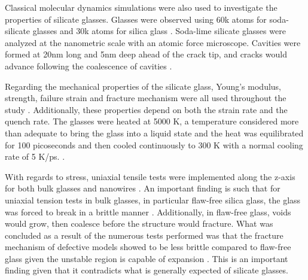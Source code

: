 Classical molecular dynamics simulations were also used to investigate the properties of silicate glasses. Glasses were observed using 60k atoms for soda-silicate glasses and 30k atoms for silica glass \cite{pedone2015dynamics}. Soda-lime silicate glasses were analyzed at the nanometric scale with an atomic force microscope. Cavities were formed at 20nm long and 5nm deep ahead of the crack tip, and cracks would advance following the coalescence of cavities \cite{pedone2015dynamics}.

Regarding the mechanical properties of the silicate glass, Young's modulus, strength, failure strain and fracture mechanism were all used throughout the study \cite{pedone2015dynamics}.  Additionally, these properties depend on both the strain rate and the quench rate. The glasses were heated at 5000 K, a temperature considered more than adequate to bring the glass into a liquid state and the heat was equilibrated for 100 picoseconds and then cooled continuously to 300 K with a normal cooling rate of 5 K/ps. \cite{pedone2015dynamics}.

With regards to stress, uniaxial tensile tests were implemented along the z-axis for both bulk glasses and nanowires \cite{pedone2015dynamics}. An important finding is such that for uniaxial tension tests in bulk glasses, in particular flaw-free silica glass, the glass was forced to break in a brittle manner \cite{pedone2015dynamics}. Additionally, in flaw-free glass, voids would grow, then coalesce before the structure would fracture. What was concluded as a result of the numerous tests performed was that the fracture mechanism of defective models showed to be less brittle compared to flaw-free glass given the unstable region is capable of expansion \cite{pedone2015dynamics}. This is an important finding given that it contradicts what is generally expected of silicate glasses.\cite{radialDistribution}



